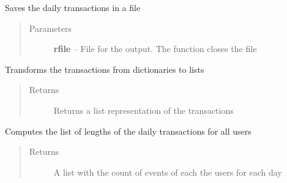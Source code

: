 \documentclass[letterpaper,10pt,english]{sphinxmanual}
\begin{document}
\begin{fulllineitems}
\begin{fulllineitems}
\end{fulllineitems}


\begin{fulllineitems}
\label{index:SuperHub.Transactions.DailyTransactions.save}
Saves the daily transactions in a file
\begin{quote}\begin{description}
\item[{Parameters}] \leavevmode
\textbf{rfile} -- File for the output. The function closes the file

\end{description}\end{quote}

\end{fulllineitems}


\begin{fulllineitems}
\label{index:SuperHub.Transactions.DailyTransactions.serialize}
Transforms the transactions from dictionaries to lists
\begin{quote}\begin{description}
\item[{Returns}] \leavevmode
Returns a list representation of the transactions

\end{description}\end{quote}

\end{fulllineitems}


\begin{fulllineitems}
\label{index:SuperHub.Transactions.DailyTransactions.users_daily_length}
Computes the list of lengths of the daily transactions for all users
\begin{quote}\begin{description}
\item[{Returns}] \leavevmode
A list with the count of events of each the users for each day

\end{description}\end{quote}


\end{fulllineitems}
\end{fulllineitems}
\end{document}
